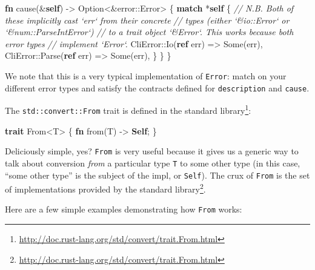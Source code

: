 \documentclass[a4paper,]{book}
\newenvironment{Shaded}{\begin{snugshade}}{\end{snugshade}}
\newcommand{\KeywordTok}[1]{\textcolor[rgb]{0.13,0.29,0.53}{\textbf{{#1}}}}
\newcommand{\DataTypeTok}[1]{\textcolor[rgb]{0.13,0.29,0.53}{{#1}}}
\newcommand{\ConstantTok}[1]{\textcolor[rgb]{0.00,0.00,0.00}{{#1}}}
\newcommand{\CommentTok}[1]{\textcolor[rgb]{0.56,0.35,0.01}{\textit{{#1}}}}
\newcommand{\NormalTok}[1]{{#1}}
\renewcommand{\href}[2]{#2\footnote{\url{#1}}}
\begin{document}
\begin{Shaded}
\begin{Highlighting}[]
    \KeywordTok{fn} \NormalTok{cause(&}\KeywordTok{self}\NormalTok{) -> }\DataTypeTok{Option}\NormalTok{<&error::Error> \{}
        \KeywordTok{match} \NormalTok{*}\KeywordTok{self} \NormalTok{\{}
            \CommentTok{// N.B. Both of these implicitly cast `err` from their concrete}
            \CommentTok{// types (either `&io::Error` or `&num::ParseIntError`)}
            \CommentTok{// to a trait object `&Error`. This works because both error types}
            \CommentTok{// implement `Error`.}
            \NormalTok{CliError::Io(}\KeywordTok{ref} \NormalTok{err) => }\ConstantTok{Some}\NormalTok{(err),}
            \NormalTok{CliError::Parse(}\KeywordTok{ref} \NormalTok{err) => }\ConstantTok{Some}\NormalTok{(err),}
        \NormalTok{\}}
    \NormalTok{\}}
\NormalTok{\}}
\end{Highlighting}
\end{Shaded}

We note that this is a very typical implementation of \texttt{Error}:
match on your different error types and satisfy the contracts defined
for \texttt{description} and \texttt{cause}.


The \texttt{std::convert::From} trait is
\href{http://doc.rust-lang.org/std/convert/trait.From.html}{defined in
the standard library}:

\begin{Shaded}
\begin{Highlighting}[]
\KeywordTok{trait} \NormalTok{From<T> \{}
    \KeywordTok{fn} \NormalTok{from(T) -> }\KeywordTok{Self}\NormalTok{;}
\NormalTok{\}}
\end{Highlighting}
\end{Shaded}

Deliciously simple, yes? \texttt{From} is very useful because it gives
us a generic way to talk about conversion \emph{from} a particular type
\texttt{T} to some other type (in this case, ``some other type'' is the
subject of the impl, or \texttt{Self}). The crux of \texttt{From} is the
\href{http://doc.rust-lang.org/std/convert/trait.From.html}{set of
implementations provided by the standard library}.

Here are a few simple examples demonstrating how \texttt{From} works:
\end{document}
